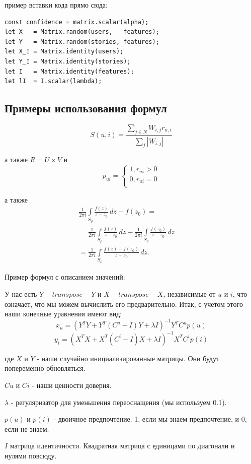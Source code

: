 пример вставки кода прямо сюда:
\par\medskip
\begin{lstlisting}
const confidence = matrix.scalar(alpha);
let X   = Matrix.random(users,   features);
let Y   = Matrix.random(stories, features);
let X_I = Matrix.identity(users);
let Y_I = Matrix.identity(stories);
let I   = Matrix.identity(features);
let lI  = I.scalar(lambda);
\end{lstlisting}

\subsection{Примеры использования формул}
$$S(u, i) = \frac{\sum\limits_{j \in N} W_{i,j} r_{u,i}}{\sum\limits_j |W_{i,j}|}$$

а также $R = U \times V$ и
\begin{equation}
  p_{ui} = \left\{\begin{array}{c}
    1, r_{ui} > 0 \\
    0, r_{ui} = 0 \\
  \end{array}\right.
\end{equation}

а также
\begin{multline*}
  \frac{1}{2\pi i} \int\limits_{S_\rho} \frac{f(z)}{z - z_0}\,dz - f(z_0) =\\
  = \frac{1}{2\pi i} \int\limits_{S_\rho} \frac{f(z)}{z - z_0}\,dz - \frac{1}{2\pi i} \int\limits_{S_\rho} \frac{f(z_0)}{z - z_0}\,dz =\\
  = \frac{1}{2\pi i} \int\limits_{S_\rho} \frac{f(z) - f(z_0)}{z - z_0}\,dz.
\end{multline*}

Пример формул с описанием значений:

У нас есть $Y-transpose-Y$ и $X-transpose-X$, независимые от $u$ и $i$, что означает, что мы можем вычислить его предварительно.
Итак, с учетом этого наши конечные уравнения имеют вид:
$$x_u = (Y^T Y + Y^T (C^u - I)Y + \lambda I)^{-1} Y^T C^u p(u)$$
$$y_i = (X^T X + X^T (C^i - I)X + \lambda I)^{-1} X^T C^i p(i)$$

\begin{ESKDexplanation}%
  \item[где ] $X$ и $ Y$ - наши случайно инициализированные матрицы. Они будут попеременно обновляться.
  \item $Cu$ и $Ci$ - наши ценности доверия.
  \item $\lambda$ - регуляризатор для уменьшения переоснащения (мы используем 0.1).
  \item $p(u)$ и $p(i)$ - двоичное предпочтение. 1, если мы знаем предпочтение, и 0, если не знаем.
  \item $I$ матрица идентичности. Квадратная матрица с единицами по диагонали и нулями повсюду.
\end{ESKDexplanation}
